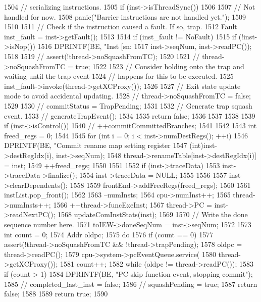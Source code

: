 \begin{DoxyCode}
{1504     // serializing instructions.
1505     if (inst->isThreadSync())
1506     {
1507         // Not handled for now.
1508         panic("Barrier instructions are not handled yet.\n");
1509     }
1510 
1511     // Check if the instruction caused a fault.  If so, trap.
1512     Fault inst_fault = inst->getFault();
1513 
1514     if (inst_fault != NoFault) {
1515         if (!inst->isNop()) {
1516             DPRINTF(BE, "Inst [sn:%
1517                     inst->seqNum, inst->readPC());
1518 
1519 //            assert(!thread->noSquashFromTC);
1520 
1521 //            thread->noSquashFromTC = true;
1522 
1523             // Consider holding onto the trap and waiting until the trap event
1524             // happens for this to be executed.
1525             inst_fault->invoke(thread->getXCProxy());
1526 
1527             // Exit state update mode to avoid accidental updating.
1528 //            thread->noSquashFromTC = false;
1529 
1530 //            commitStatus = TrapPending;
1531 
1532             // Generate trap squash event.
1533 //            generateTrapEvent();
1534 
1535             return false;
1536         }
1537     }
1538 
1539     if (inst->isControl()) {
1540 //        ++commitCommittedBranches;
1541     }
1542 
1543     int freed_regs = 0;
1544 
1545     for (int i = 0; i < inst->numDestRegs(); ++i) {
1546         DPRINTF(BE, "Commit rename map setting register %
1547                 (int)inst->destRegIdx(i), inst->seqNum);
1548         thread->renameTable[inst->destRegIdx(i)] = inst;
1549         ++freed_regs;
1550     }
1551 
1552     if (inst->traceData) {
1553         inst->traceData->finalize();
1554         inst->traceData = NULL;
1555     }
1556 
1557     inst->clearDependents();
1558 
1559     frontEnd->addFreeRegs(freed_regs);
1560 
1561     instList.pop_front();
1562 
1563     --numInsts;
1564     cpu->numInst++;
1565     thread->numInsts++;
1566     ++thread->funcExeInst;
1567     thread->PC = inst->readNextPC();
1568     updateComInstStats(inst);
1569 
1570     // Write the done sequence number here.
1571     toIEW->doneSeqNum = inst->seqNum;
1572 
1573     int count = 0;
1574     Addr oldpc;
1575     do {
1576         if (count == 0)
1577             assert(!thread->noSquashFromTC && !thread->trapPending);
1578         oldpc = thread->readPC();
1579         cpu->system->pcEventQueue.service(
1580             thread->getXCProxy());
1581         count++;
1582     } while (oldpc != thread->readPC());
1583     if (count > 1) {
1584         DPRINTF(BE, "PC skip function event, stopping commit\n");
1585 //        completed_last_inst = false;
1586 //        squashPending = true;
1587         return false;
1588     }
1589     return true;
1590 }
\end{DoxyCode}
